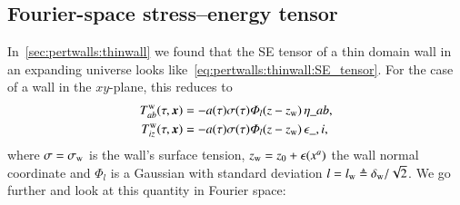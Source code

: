 \subsection{Fourier-space stress--energy tensor}\label{sec:pertwalls:gws:Fourier_SE_tensor}
    In~\cref{sec:pertwalls:thinwall} we found that the SE tensor of a thin domain wall in an expanding universe looks like~\cref{eq:pertwalls:thinwall:SE_tensor}. For the case of a wall in the $xy$-plane, this reduces to
    \begin{equation}
        \begin{split}
            T\ap{w}_{ab}(\tau, \vec{x}) 
             &=  -a (\tau)\sigma(\tau) \varPhi_l(z-z\ped{w}) \, \eta\_{ab}, \\
            T\ap{w}_{iz}(\tau, \vec{x}) 
            &= -a (\tau)\sigma(\tau) \varPhi_l(z-z\ped{w} ) \,\epsilon\_{,i}, %
        \end{split}
    \end{equation}
    where $\sigma=\sigma_\mathrm{w}$ is the wall's surface tension, $z\ped{w} = z_0 + \epsilon(x\^a)$ the wall normal coordinate and $\varPhi_l$ is a Gaussian with standard deviation $l= l_\mathrm{w} \triangleq \delta_\mathrm{w}/\sqrt{2}$. We go further and look at this quantity in Fourier space:
